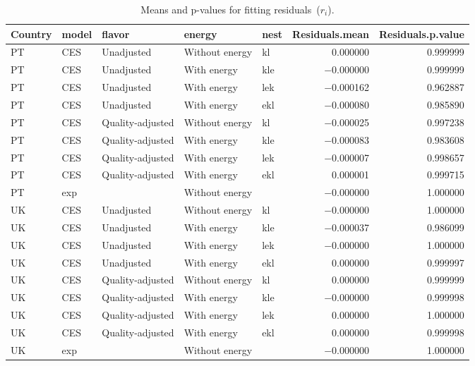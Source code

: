 \documentclass[preprint,authoryear,12pt]{elsarticle}\usepackage[]{graphicx}\usepackage[]{color}
\begin{document}
\begin{table}[ht]
\centering
\caption{Means and p-values for fitting residuals~($r_i$).} 
\label{tab:r_p_values}
{\tiny
\begin{tabular}{lllllrr}
  \hline
Country & model & flavor & energy & nest & Residuals.mean & Residuals.p.value \\ 
  \hline
PT & CES & Unadjusted & Without energy & kl & 0.000000 & 0.999999 \\ 
  PT & CES & Unadjusted & With energy & kle & $-$0.000000 & 0.999999 \\ 
  PT & CES & Unadjusted & With energy & lek & $-$0.000162 & 0.962887 \\ 
  PT & CES & Unadjusted & With energy & ekl & $-$0.000080 & 0.985890 \\ 
  PT & CES & Quality-adjusted & Without energy & kl & $-$0.000025 & 0.997238 \\ 
  PT & CES & Quality-adjusted & With energy & kle & $-$0.000083 & 0.983608 \\ 
  PT & CES & Quality-adjusted & With energy & lek & $-$0.000007 & 0.998657 \\ 
  PT & CES & Quality-adjusted & With energy & ekl & 0.000001 & 0.999715 \\ 
  PT & exp &  & Without energy &  & $-$0.000000 & 1.000000 \\ 
  UK & CES & Unadjusted & Without energy & kl & $-$0.000000 & 1.000000 \\ 
  UK & CES & Unadjusted & With energy & kle & $-$0.000037 & 0.986099 \\ 
  UK & CES & Unadjusted & With energy & lek & $-$0.000000 & 1.000000 \\ 
  UK & CES & Unadjusted & With energy & ekl & 0.000000 & 0.999997 \\ 
  UK & CES & Quality-adjusted & Without energy & kl & 0.000000 & 0.999999 \\ 
  UK & CES & Quality-adjusted & With energy & kle & $-$0.000000 & 0.999998 \\ 
  UK & CES & Quality-adjusted & With energy & lek & 0.000000 & 1.000000 \\ 
  UK & CES & Quality-adjusted & With energy & ekl & 0.000000 & 0.999998 \\ 
  UK & exp &  & Without energy &  & $-$0.000000 & 1.000000 \\ 
   \hline
\end{tabular}
}
\end{table}
\end{document}
